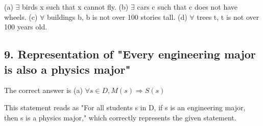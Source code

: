 \documentclass{article}
\begin{document}
(a) $\exists$ birds x such that x cannot fly.
(b) $\exists$ cars c such that c does not have wheels.
(c) $\forall$ buildings b, b is not over 100 stories tall.
(d) $\forall$ trees t, t is not over 100 years old.

\subsection*{9. Representation of "Every engineering major is also a physics major"}

The correct answer is (a) $\forall s \in D, M(s) \Rightarrow S(s)$

This statement reads as "For all students s in D, if s is an engineering major, then s is a physics major," which correctly represents the given statement.
\end{document}
